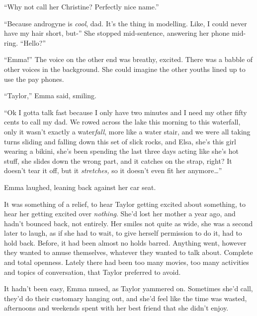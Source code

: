 ``Why not call her Christine?  Perfectly nice name.''



``Because androgyne is \emph{cool}, dad.  It's the thing in modelling.  Like, I could never have my hair short, but-''  She stopped mid-sentence, answering her phone mid-ring.  ``Hello?''



``Emma!''  The voice on the other end was breathy, excited.  There was a babble of other voices in the background.  She could imagine the other youths lined up to use the pay phones.



``Taylor,'' Emma said, smiling.



``Ok I gotta talk fast because I only have two minutes and I need my other fifty cents to call my dad.  We rowed across the lake this morning to this waterfall, only it wasn't exactly a water\emph{fall}, more like a water stair, and we were all taking turns sliding and falling down this set of slick rocks, and Elsa, she's this girl wearing a bikini, she's been spending the last three days acting like she's hot stuff, she slides down the wrong part, and it catches on the strap, right?  It doesn't tear it off, but it \emph{stretches, }so it doesn't even fit her anymore\emph{\ldots}''



Emma laughed, leaning back against her car seat.



It was something of a relief, to hear Taylor getting excited about something, to hear her getting excited over \emph{nothing}.  She'd lost her mother a year ago, and hadn't bounced back, not entirely.  Her smiles not quite as wide, she was a second later to laugh, as if she had to wait, to give herself permission to do it, had to hold back.  Before, it had been almost no holds barred.  Anything went, however they wanted to amuse themselves, whatever they wanted to talk about.  Complete and total openness.  Lately there had been too many movies, too many activities and topics of conversation, that Taylor preferred to avoid.



It hadn't been easy, Emma mused, as Taylor yammered on.  Sometimes she'd call, they'd do their customary hanging out, and she'd feel like the time was wasted, afternoons and weekends spent with her best friend that she didn't enjoy.




